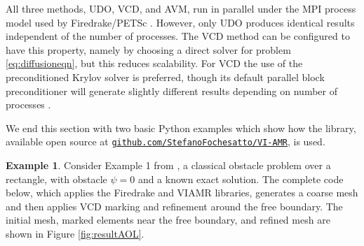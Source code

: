 \documentclass[]{interact}
\theoremstyle{plain}%
\theoremstyle{definition}
\newtheorem{example}[theorem]{Example}
\theoremstyle{remark}
\begin{document}
All three methods, UDO, VCD, and AVM, run in parallel under the MPI process model used by Firedrake/PETSc \cite{Bueler2021,Langeetal2016}.  However, only UDO produces identical results independent of the number of processes.  The VCD method can be configured to have this property, namely by choosing a direct solver for problem \eqref{eq:diffusioneqn}, but this reduces scalability.  For VCD the use of the preconditioned Krylov solver is preferred, though its default parallel block preconditioner will generate slightly different results depending on number of processes \cite{Bueler2021}.

We end this section with two basic Python examples which show how the library, available open source at \href{https://github.com/StefanoFochesatto/VI-AMR}{{\small \texttt{github.com/StefanoFochesatto/VI-AMR}}}, is used.

\begin{example} \label{example:AOL}
Consider Example 1 from \cite{AinsworthOdenLee1993}, a classical obstacle problem over a rectangle, with obstacle $\psi=0$ and a known exact solution.  The complete code below, which applies the Firedrake and VIAMR libraries, generates a coarse mesh and then applies VCD marking and refinement around the free boundary.  The initial mesh, marked elements near the free boundary, and refined mesh are shown in Figure \ref{fig:resultAOL}.
\inputminted[linenos, frame=lines]{python}{../examples/aol.py}
\end{example}
\end{document}
